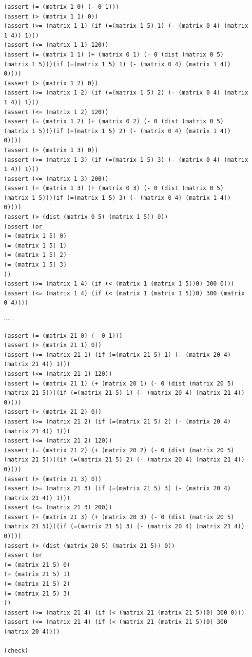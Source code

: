 \documentclass[12pt]{article}
\begin{document}
{{\begin{verbatim}
(assert (= (matrix 1 0) (- 0 1)))
(assert (> (matrix 1 1) 0))
(assert (>= (matrix 1 1) (if (=(matrix 1 5) 1) (- (matrix 0 4) (matrix 1 4)) 1)))
(assert (<= (matrix 1 1) 120))
(assert (= (matrix 1 1) (+ (matrix 0 1) (- 0 (dist (matrix 0 5) (matrix 1 5)))(if (=(matrix 1 5) 1) (- (matrix 0 4) (matrix 1 4)) 0))))
(assert (> (matrix 1 2) 0))
(assert (>= (matrix 1 2) (if (=(matrix 1 5) 2) (- (matrix 0 4) (matrix 1 4)) 1)))
(assert (<= (matrix 1 2) 120))
(assert (= (matrix 1 2) (+ (matrix 0 2) (- 0 (dist (matrix 0 5) (matrix 1 5)))(if (=(matrix 1 5) 2) (- (matrix 0 4) (matrix 1 4)) 0))))
(assert (> (matrix 1 3) 0))
(assert (>= (matrix 1 3) (if (=(matrix 1 5) 3) (- (matrix 0 4) (matrix 1 4)) 1)))
(assert (<= (matrix 1 3) 200))
(assert (= (matrix 1 3) (+ (matrix 0 3) (- 0 (dist (matrix 0 5) (matrix 1 5)))(if (=(matrix 1 5) 3) (- (matrix 0 4) (matrix 1 4)) 0))))
(assert (> (dist (matrix 0 5) (matrix 1 5)) 0))
(assert (or
(= (matrix 1 5) 0)
(= (matrix 1 5) 1)
(= (matrix 1 5) 2)
(= (matrix 1 5) 3)
))
(assert (>= (matrix 1 4) (if (< (matrix 1 (matrix 1 5))0) 300 0)))
(assert (<= (matrix 1 4) (if (< (matrix 1 (matrix 1 5))0) 300 (matrix 0 4))))
\end{verbatim}
$\cdots \cdots$
\begin{verbatim}
(assert (= (matrix 21 0) (- 0 1)))
(assert (> (matrix 21 1) 0))
(assert (>= (matrix 21 1) (if (=(matrix 21 5) 1) (- (matrix 20 4) (matrix 21 4)) 1)))
(assert (<= (matrix 21 1) 120))
(assert (= (matrix 21 1) (+ (matrix 20 1) (- 0 (dist (matrix 20 5) (matrix 21 5)))(if (=(matrix 21 5) 1) (- (matrix 20 4) (matrix 21 4)) 0))))
(assert (> (matrix 21 2) 0))
(assert (>= (matrix 21 2) (if (=(matrix 21 5) 2) (- (matrix 20 4) (matrix 21 4)) 1)))
(assert (<= (matrix 21 2) 120))
(assert (= (matrix 21 2) (+ (matrix 20 2) (- 0 (dist (matrix 20 5) (matrix 21 5)))(if (=(matrix 21 5) 2) (- (matrix 20 4) (matrix 21 4)) 0))))
(assert (> (matrix 21 3) 0))
(assert (>= (matrix 21 3) (if (=(matrix 21 5) 3) (- (matrix 20 4) (matrix 21 4)) 1)))
(assert (<= (matrix 21 3) 200))
(assert (= (matrix 21 3) (+ (matrix 20 3) (- 0 (dist (matrix 20 5) (matrix 21 5)))(if (=(matrix 21 5) 3) (- (matrix 20 4) (matrix 21 4)) 0))))
(assert (> (dist (matrix 20 5) (matrix 21 5)) 0))
(assert (or
(= (matrix 21 5) 0)
(= (matrix 21 5) 1)
(= (matrix 21 5) 2)
(= (matrix 21 5) 3)
))
(assert (>= (matrix 21 4) (if (< (matrix 21 (matrix 21 5))0) 300 0)))
(assert (<= (matrix 21 4) (if (< (matrix 21 (matrix 21 5))0) 300 (matrix 20 4))))

(check)

\end{verbatim}
}

}
\end{document}
